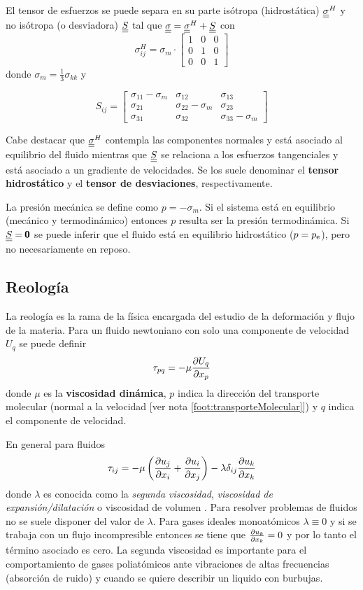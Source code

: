El tensor de esfuerzos se puede separa en su parte isótropa (hidrostática) $\underline{\underline{\sigma}}^H$ y no isótropa (o desviadora) $\underline{\underline{S}}$ tal que $\underline{\underline{\sigma}}=\underline{\underline{\sigma}}^H+\underline{\underline{S}}$ con
\[
\sigma_{ij}^H=\sigma_m \cdot \begin{bmatrix}
1 & 0 & 0 \\
0 & 1 & 0 \\
0 & 0 & 1
\end{bmatrix}
\]
donde $\sigma_m = \frac{1}{3}\sigma_{kk}$ y 

\[
S_{ij}= \begin{bmatrix}
\sigma_{11}-\sigma_m & \sigma_{12} & \sigma_{13} \\
\sigma_{21} & \sigma_{22}-\sigma_m & \sigma_{23} \\
\sigma_{31} & \sigma_{32} & \sigma_{33}-\sigma_m 
\end{bmatrix}
\]

Cabe destacar que $\underline{\underline{\sigma}}^H$ contempla las componentes normales y está asociado al equilibrio del fluido mientras que $\underline{\underline{S}}$ se relaciona a los esfuerzos tangenciales y está asociado a un gradiente de velocidades. Se los suele denominar el \textbf{tensor hidrostático} y el \textbf{tensor de desviaciones}, respectivamente. 

La presión mecánica se define como $p=-\sigma_m$. Si el sistema está en equilibrio (mecánico y termodinámico) entonces $p$ resulta ser la presión termodinámica. Si $\underline{\underline{S}}=\pmb{0}$ se puede inferir que el fluido está en equilibrio hidrostático ($p=\pe$), pero no necesariamente en reposo.
 \label{sec:presionmecanica}
 

\subsection{Reología} \label{sec:reologia}
La reología es la rama de la física encargada del estudio de la deformación y flujo de la materia. Para un fluido newtoniano con solo una componente de velocidad $U_q$ se puede definir
\begin{equation}
    \tau_{pq}=-\mu \frac{\partial U_q}{\partial x_p}
\end{equation}
donde $\mu$ es la \textbf{viscosidad dinámica}, $p$ indica la dirección del transporte molecular (normal a la velocidad [ver nota \ref{foot:transporteMolecular}]) y $q$ indica el componente de velocidad.

En general para fluidos
\begin{equation}
    \tau_{ij}=-\mu \left( \frac{\partial u_j}{\partial x_i}+\frac{\partial u_i}{\partial x_j}\right) -\lambda \delta_{ij} \frac{\partial u_k}{\partial x_k}
\end{equation}
donde $\lambda$ es conocida como la \textit{segunda viscosidad}, \textit{viscosidad de expansión/dilatación} o viscosidad de volumen \citep{durst2008fluid}. Para resolver problemas de fluidos no se suele disponer del valor de $\lambda$. Para gases ideales monoatómicos $\lambda \equiv 0$ y si se trabaja con un flujo incompresible entonces se tiene que $\frac{\partial u_k}{\partial x_k}=0$ y por lo tanto el término asociado es cero. La segunda viscosidad es importante para el comportamiento de gases poliatómicos ante vibraciones de altas frecuencias (absorción de ruido) y cuando se quiere describir un liquido con burbujas.

